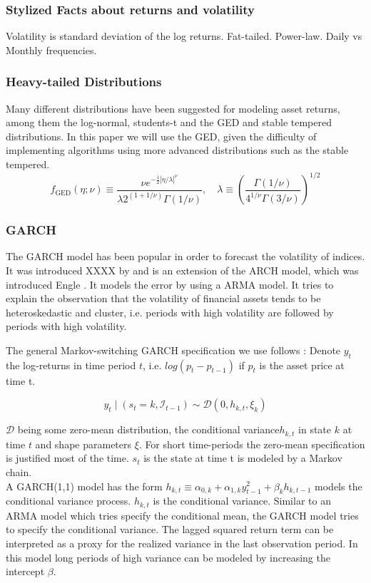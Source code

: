\documentclass[11pt,a4paper]{article}
\begin{document}
\subsubsection{Stylized Facts about returns and volatility}
Volatility is standard deviation of the log returns.
Fat-tailed. Power-law. Daily vs Monthly frequencies. 

\subsubsection{Heavy-tailed Distributions}
Many different distributions have been suggested for modeling asset returns, among them the log-normal, students-t and the \ac{GED} and stable tempered distributions.
In this paper we will use the \ac{GED}, given the difficulty of implementing algorithms using more advanced distributions such as the stable tempered.
$$f_{\mathrm{GED}}(\eta ; \nu) \equiv \frac{\nu e^{-\frac{1}{2}|\eta / \lambda|^\nu}}{\lambda 2^{(1+1 / \nu)} \Gamma(1 / \nu)}, \quad \lambda \equiv\left(\frac{\Gamma(1 / \nu)}{4^{1 / \nu} \Gamma(3 / \nu)}\right)^{1 / 2}$$

\subsubsection{GARCH}
\label{sss:GARCH}
The \ac{GARCH} model has been popular in order to forecast the volatility of indices. It was introduced XXXX by \cite{} and is an extension of the ARCH model, which was introduced Engle \cite{}. It models the error by using a \ac{ARMA} model.
It tries to explain the observation that the volatility of financial assets tends to be heteroskedastic and cluster, i.e. periods with high volatility are followed by periods with high volatility.

The general Markov-switching GARCH specification we use follows \cite{ardia_markov-switching_2019}: 
Denote $y_t$ the log-returns in time period $t$, i.e. $log(p_t-p_{t-1})$ if $p_t$ is the asset price at time t.

$$y_{t} \mid\left(s_{t}=k, \mathcal{I}_{t-1}\right) \sim \mathcal{D}\left(0, h_{k, t}, \xi_{k}\right)$$

$\mathcal{D}$ being some zero-mean distribution, the conditional variance$h_{k,t}$ in state $k$ at time $t$ and shape parameters $\xi$. For short time-periods the zero-mean specification is justified most of the time.  $s_t$ is the state at time t is modeled by a Markov chain.\\

A GARCH(1,1) model has the form $h_{k, t} \equiv \alpha_{0, k}+\alpha_{1, k} y_{t-1}^{2}+\beta_{k} h_{k, t-1}$ models the conditional variance process. $h_{k,t}$ is the conditional variance. Similar to an \ac{ARMA} model which tries specify the conditional mean, the \ac{GARCH} model tries to specify the conditional variance. The lagged squared return term can be interpreted as a proxy for the realized variance in the last observation period. 
In this model long periods of high variance can be modeled by increasing the intercept $\beta$.\\
\end{document}
